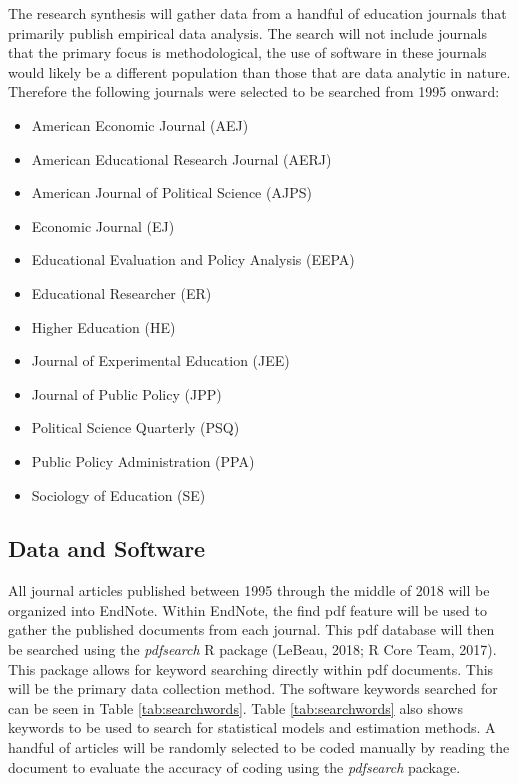 \documentclass[english,,man]{apa6}
\providecommand{\tightlist}{%
  \setlength{\itemsep}{0pt}\setlength{\parskip}{0pt}}
\theoremstyle{definition}
\theoremstyle{definition}
\theoremstyle{definition}
\theoremstyle{remark}
\begin{document}
The research synthesis will gather data from a handful of education
journals that primarily publish empirical data analysis. The search will
not include journals that the primary focus is methodological, the use
of software in these journals would likely be a different population
than those that are data analytic in nature. Therefore the following
journals were selected to be searched from 1995 onward:

\begin{itemize}
\tightlist
\item
  American Economic Journal (AEJ)
\item
  American Educational Research Journal (AERJ)
\item
  American Journal of Political Science (AJPS)
\item
  Economic Journal (EJ)
\item
  Educational Evaluation and Policy Analysis (EEPA)
\item
  Educational Researcher (ER)
\item
  Higher Education (HE)
\item
  Journal of Experimental Education (JEE)
\item
  Journal of Public Policy (JPP)
\item
  Political Science Quarterly (PSQ)
\item
  Public Policy Administration (PPA)
\item
  Sociology of Education (SE)
\end{itemize}

\hypertarget{data-and-software}{%
\subsection{Data and Software}\label{data-and-software}}

All journal articles published between 1995 through the middle of 2018
will be organized into EndNote. Within EndNote, the find pdf feature
will be used to gather the published documents from each journal. This
pdf database will then be searched using the \emph{pdfsearch} R package
(LeBeau, 2018; R Core Team, 2017). This package allows for keyword
searching directly within pdf documents. This will be the primary data
collection method. The software keywords searched for can be seen in
Table \ref{tab:searchwords}. Table \ref{tab:searchwords} also shows
keywords to be used to search for statistical models and estimation
methods. A handful of articles will be randomly selected to be coded
manually by reading the document to evaluate the accuracy of coding
using the \emph{pdfsearch} package.
\end{document}
